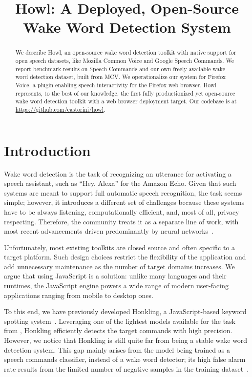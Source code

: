\documentclass[11pt,a4paper]{article}
\title{Howl: A Deployed, Open-Source Wake Word Detection System}
\author{Raphael Tang,$^1$\thanks{\hspace{2mm}Equal contribution. Order decided by coin flip.} \hspace{0.125cm}Jaejun Lee,$^{1*}$ Afsaneh Razi,$^2$ Julia Cambre,$^2$\\ {\bf Ian Bicking,$^2$ Jofish Kaye,$^2$ \and Jimmy Lin$^1$}\\
$^1$David R. Cheriton School of Computer Science, University of Waterloo\\
$^2$Mozilla}
\date{}
\begin{document}
\maketitle
\begin{abstract}
We describe Howl, an open-source wake word detection toolkit with native support for open speech datasets, like Mozilla Common Voice and Google Speech Commands.
We report benchmark results on Speech Commands and our own freely available wake word detection dataset, built from MCV.
We operationalize our system for Firefox Voice, a plugin enabling speech interactivity for the Firefox web browser.
Howl represents, to the best of our knowledge, the first fully productionized yet open-source wake word detection toolkit with a web browser deployment target.
Our codebase is at \url{https://github.com/castorini/howl}.

\end{abstract}



\section{Introduction}
Wake word detection is the task of recognizing an utterance for activating a speech assistant, such as ``Hey, Alexa'' for the Amazon Echo.
Given that such systems are meant to support full automatic speech recognition, the task seems simple; however, it introduces a different set of challenges because these systems have to be always listening, computationally efficient, and, most of all, privacy respecting.
Therefore, the community treats it as a separate line of work, with most recent advancements driven predominantly by neural networks~\cite{sainath2015convolutional, tang2018deep}.


Unfortunately, most existing toolkits are closed source and often specific to a target platform.
Such design choices restrict the flexibility of the application and add unnecessary maintenance as the number of target domains increases.
We argue that using JavaScript is a solution: unlike many languages and their runtimes, the JavaScript engine powers a wide range of modern user-facing applications ranging from mobile  to desktop ones.


To this end, we have previously developed Honkling, a JavaScript-based keyword spotting system~\cite{lee2019honkling}.
Leveraging one of the lightest models available for the task from \citet{tang2018deep}, Honkling efficiently detects the target commands with high precision. 
However, we notice that Honkling is still quite far from being a stable wake word detection system.
This gap mainly arises from the model being trained as a speech commands classifier, instead of a wake word detector; its high false alarm rate results from the limited number of negative samples in the training dataset~\cite{warden2018speech}.
\end{document}
